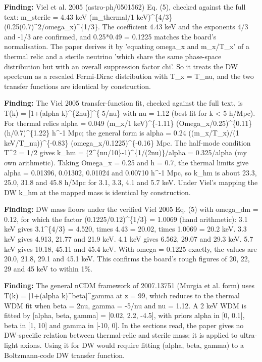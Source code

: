 \documentclass[11pt,a4paper]{article}
\begin{document}
\textbf{Finding:} Viel et al. 2005 (astro-ph/0501562) Eq. (5), checked against the full text: m\_sterile = 4.43 keV (m\_thermal/1 keV)\textasciicircum{}\{4/3\} (0.25(0.7)\textasciicircum{}2/omega\_x)\textasciicircum{}\{1/3\}. The coefficient 4.43 keV and the exponents 4/3 and -1/3 are confirmed, and 0.25*0.49 = 0.1225 matches the board's normalisation. The paper derives it by 'equating omega\_x and m\_x/T\_x' of a thermal relic and a sterile neutrino 'which share the same phase-space distribution but with an overall suppression factor chi'. So it treats the DW spectrum as a rescaled Fermi-Dirac distribution with T\_x = T\_nu, and the two transfer functions are identical by construction.

\textbf{Finding:} The Viel 2005 transfer-function fit, checked against the full text, is T(k) = [1+(alpha k)\textasciicircum{}\{2nu\}]\textasciicircum{}\{-5/nu\} with nu = 1.12 (best fit for k \textless{} 5 h/Mpc). For thermal relics alpha = 0.049 (m\_x/1 keV)\textasciicircum{}\{-1.11\} (Omega\_x/0.25)\textasciicircum{}\{0.11\} (h/0.7)\textasciicircum{}\{1.22\} h\textasciicircum{}-1 Mpc; the general form is alpha = 0.24 ((m\_x/T\_x)/(1 keV/T\_nu))\textasciicircum{}\{-0.83\} (omega\_x/0.1225)\textasciicircum{}\{-0.16\} Mpc. The half-mode condition T\textasciicircum{}2 = 1/2 gives k\_hm = (2\textasciicircum{}\{nu/10\}-1)\textasciicircum{}\{1/(2nu)\}/alpha = 0.325/alpha (my own arithmetic). Taking Omega\_x = 0.25 and h = 0.7, the thermal limits give alpha = 0.01396, 0.01302, 0.01024 and 0.00710 h\textasciicircum{}-1 Mpc, so k\_hm is about 23.3, 25.0, 31.8 and 45.8 h/Mpc for 3.1, 3.3, 4.1 and 5.7 keV. Under Viel's mapping the DW k\_hm at the mapped mass is identical by construction.

\textbf{Finding:} DW mass floors under the verified Viel 2005 Eq. (5) with omega\_dm = 0.12, for which the factor (0.1225/0.12)\textasciicircum{}\{1/3\} = 1.0069 (hand arithmetic): 3.1 keV gives 3.1\textasciicircum{}\{4/3\} = 4.520, times 4.43 = 20.02, times 1.0069 = 20.2 keV. 3.3 keV gives 4.913, 21.77 and 21.9 keV. 4.1 keV gives 6.562, 29.07 and 29.3 keV. 5.7 keV gives 10.18, 45.11 and 45.4 keV. With omega = 0.1225 exactly, the values are 20.0, 21.8, 29.1 and 45.1 keV. This confirms the board's rough figures of 20, 22, 29 and 45 keV to within 1\%.

\textbf{Finding:} The general nCDM framework of 2007.13751 (Murgia et al. form) uses T(k) = [1+(alpha k)\textasciicircum{}beta]\textasciicircum{}gamma at z = 99, which reduces to the thermal WDM fit when beta = 2nu, gamma = -5/nu and nu = 1.12. A 2 keV WDM is fitted by [alpha, beta, gamma] = [0.02, 2.2, -4.5], with priors alpha in [0, 0.1], beta in [1, 10] and gamma in [-10, 0]. In the sections read, the paper gives no DW-specific relation between thermal-relic and sterile mass; it is applied to ultra-light axions. Using it for DW would require fitting (alpha, beta, gamma) to a Boltzmann-code DW transfer function.
\end{document}
